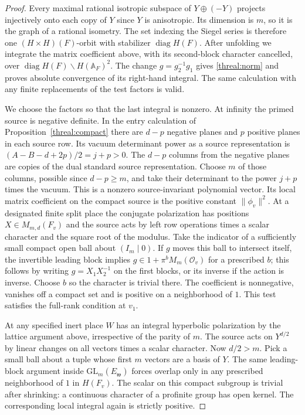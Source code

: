 \begin{proof}
Every maximal rational isotropic subspace of \(Y\oplus(-Y)\) projects
injectively onto each copy of \(Y\) since \(Y\) is anisotropic. Its
dimension is \(m\), so it is the graph of a rational isometry.
The set indexing the Siegel series is therefore one
\((H\times H)(F)\)-orbit with stabilizer \(\operatorname{diag} H(F)\).
After unfolding we integrate the matrix coefficient above, with its
second-block character cancelled, over
\(\operatorname{diag}H(F)\backslash H(\mathbb A_F)^2\).
The change \(g=g_2^{-1}g_1\) gives \eqref{threal:norm} and proves
absolute convergence of its right-hand integral. The same calculation
with any finite replacements of the test factors is valid.

We choose the factors so that the last integral is nonzero. At infinity
the primed source is negative definite. In the entry calculation of
Proposition~\ref{threal:compact} there are \(d-p\) negative planes
and \(p\) positive planes in each source row. Its vacuum determinant
power as a source representation is
\((A-B-d+2p)/2=j+p>0\). The \(d-p\) columns from the negative
planes are copies of the dual standard source representation.
Choose \(m\) of those columns, possible since \(d-p\ge m\), and
take their determinant to the power \(j+p\) times the vacuum.
This is a nonzero source-invariant polynomial vector. Its local matrix coefficient on
the compact source is the positive constant \(\|\phi_v\|^2\).
At a designated finite split place the conjugate polarization has
positions \(X\in M_{m,d}(F_v)\) and the source acts by left row
operations times a scalar character and the square root of the
modulus. Take the indicator of a sufficiently small compact open
ball about \((I_m\mid0)\). If \(g\) moves this ball to intersect
itself, the invertible leading block implies
\(g\in 1+\pi^b M_m(\mathcal O_v)\) for a prescribed \(b\);
this follows by writing \(g=X_1X_2^{-1}\) on the first blocks, or
its inverse if the action is inverse. Choose \(b\) so the character
is trivial there. The coefficient is nonnegative, vanishes off a
compact set and is positive on a neighborhood of \(1\).
This test satisfies the full-rank condition at \(v_1\).

At any specified inert place \(W\) has an integral hyperbolic
polarization by the lattice argument above, irrespective of the
parity of \(m\). The source acts on \(Y^{d/2}\) by linear changes
on all vectors times a scalar character. Now \(d/2>m\). Pick a small
ball about a tuple whose first \(m\) vectors are a basis of \(Y\).
The same leading-block argument inside \(\mathrm{GL}_m(E_{\mathfrak w})\)
forces overlap only in any prescribed neighborhood of \(1\) in
\(H(F_v)\). The scalar on this compact subgroup is trivial after
shrinking: a continuous character of a profinite group has open
kernel. The corresponding local integral again is strictly positive.


\end{proof}
